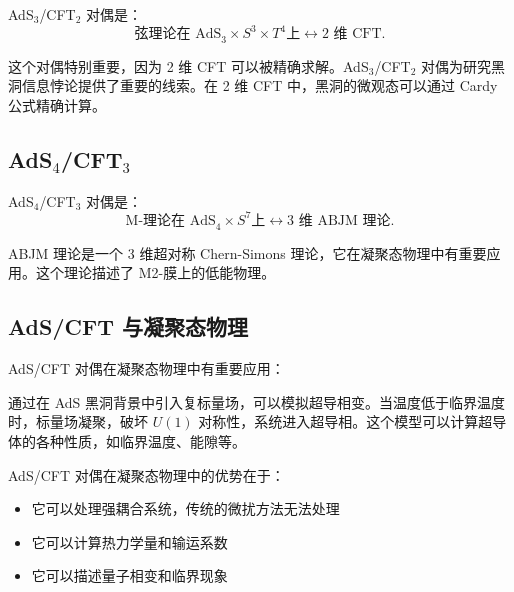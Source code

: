 AdS$_3$/CFT$_2$ 对偶是：
\begin{equation}
    \text{弦理论在 AdS}_3 \times S^3 \times T^4 \text{上}
    \longleftrightarrow
    \text{2 维 CFT}.
\end{equation}

\begin{example}
这个对偶特别重要，因为 2 维 CFT 可以被精确求解。AdS$_3$/CFT$_2$ 对偶为研究黑洞信息悖论提供了重要的线索。在 2 维 CFT 中，黑洞的微观态可以通过 Cardy 公式精确计算。
\end{example}

\subsection{AdS$_4$/CFT$_3$}

AdS$_4$/CFT$_3$ 对偶是：
\begin{equation}
    \text{M-理论在 AdS}_4 \times S^7 \text{上}
    \longleftrightarrow
    \text{3 维 ABJM 理论}.
\end{equation}

\begin{definition}[ABJM 理论]
ABJM 理论是一个 3 维超对称 Chern-Simons 理论，它在凝聚态物理中有重要应用。这个理论描述了 M2-膜上的低能物理。
\end{definition}

\subsection{AdS/CFT 与凝聚态物理}

AdS/CFT 对偶在凝聚态物理中有重要应用：

\begin{example}[全息超导体]
通过在 AdS 黑洞背景中引入复标量场，可以模拟超导相变。当温度低于临界温度时，标量场凝聚，破坏 $U(1)$ 对称性，系统进入超导相。这个模型可以计算超导体的各种性质，如临界温度、能隙等。
\end{example}

\begin{note}[全息方法在凝聚态物理中的优势]
AdS/CFT 对偶在凝聚态物理中的优势在于：
\begin{itemize}
    \item 它可以处理强耦合系统，传统的微扰方法无法处理
    \item 它可以计算热力学量和输运系数
    \item 它可以描述量子相变和临界现象
\end{itemize}
\end{note}

